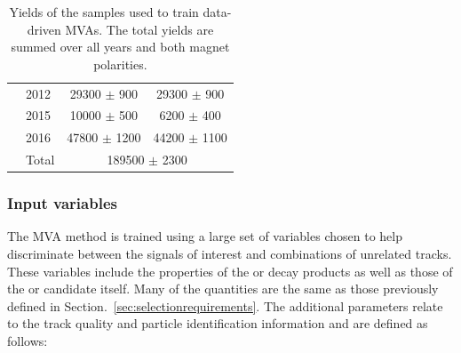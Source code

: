 \begin{table}[!h]
\begin{center}
\begin{tabular}{llcc}
                                    & 2012   & 29300 $\pm$ 900    & 29300 $\pm$ 900 \\
                                    & 2015   & 10000 $\pm$ 500    & 6200  $\pm$ 400 \\
                                    & 2016   & 47800 $\pm$ 1200   & 44200 $\pm$ 1100 \\
                                    & Total  & \multicolumn{2}{c}{189500 $\pm$ 2300}\\
         \hline
      \end{tabular}
      \caption{Yields of the samples used to train data-driven MVAs. The total yields are summed over all years and both magnet polarities.}
      \label{table:mva_training_yields}
   \end{center}
\end{table}

\subsubsection{Input variables}


The MVA method is trained using a large set of variables chosen to help discriminate between the signals of interest and combinations of unrelated tracks. These variables include the properties of the \Kpm or \pipm decay products as well as those of the \phiz or \Dsp candidate itself. Many of the quantities are the same as those previously defined in Section.~\ref{sec:selectionrequirements}. The additional parameters relate to the track quality and particle identification information and are defined as follows:

